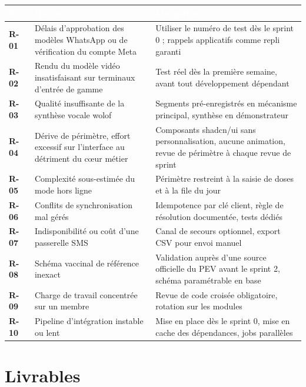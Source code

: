 \documentclass[11pt,a4paper]{article}
\newcommand{\rid}[1]{{\sffamily\bfseries\footnotesize\color{primary}#1}}
\newcommand{\hd}[1]{\textcolor{white}{\sffamily\bfseries\small #1}}
\newcommand{\rowhead}{\rowcolor{primary}}
\begin{document}
\begin{xltabular}{\textwidth}{@{}C{1.3cm} R{4.2cm} L@{}}
\toprule
\rowhead \hd{Réf.} & \hd{Risque} & \hd{Mitigation} \\
\midrule \endhead
\rid{R-01} & Délais d'approbation des modèles WhatsApp ou de vérification du compte Meta & Utiliser le numéro de test dès le sprint 0 ; rappels applicatifs comme repli garanti \\
\rid{R-02} & Rendu du modèle vidéo insatisfaisant sur terminaux d'entrée de gamme & Test réel dès la première semaine, avant tout développement dépendant \\
\rid{R-03} & Qualité insuffisante de la synthèse vocale wolof & Segments pré-enregistrés en mécanisme principal, synthèse en démonstrateur \\
\rid{R-04} & Dérive de périmètre, effort excessif sur l'interface au détriment du cœur métier & Composants shadcn/ui sans personnalisation, aucune animation, revue de périmètre à chaque revue de sprint \\
\rid{R-05} & Complexité sous-estimée du mode hors ligne & Périmètre restreint à la saisie de doses et à la file du jour \\
\rid{R-06} & Conflits de synchronisation mal gérés & Idempotence par clé client, règle de résolution documentée, tests dédiés \\
\rid{R-07} & Indisponibilité ou coût d'une passerelle SMS & Canal de secours optionnel, export CSV pour envoi manuel \\
\rid{R-08} & Schéma vaccinal de référence inexact & Validation auprès d'une source officielle du PEV avant le sprint 2, schéma paramétrable en base \\
\rid{R-09} & Charge de travail concentrée sur un membre & Revue de code croisée obligatoire, rotation sur les modules \\
\rid{R-10} & Pipeline d'intégration instable ou lent & Mise en place dès le sprint 0, mise en cache des dépendances, jobs parallèles \\
\bottomrule
\end{xltabular}

\section{Livrables}
\end{document}
